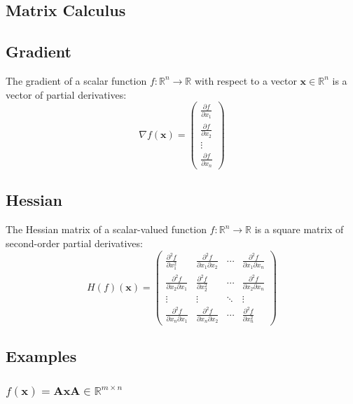 \documentclass[8pt, a4paper, landscape, includeheadfoot]{extarticle}
\begin{document}
\begin{multicols*}{4}
	\section{Matrix Calculus}
	\subsection{Gradient}
	The gradient of a scalar function $f: \mathbb{R}^n \rightarrow \mathbb{R}$ with respect to a vector $\mathbf{x} \in \mathbb{R}^n$ is a vector of partial derivatives:
	$$
		\nabla f(\mathbf{x}) = \begin{pmatrix}
			\frac{\partial f}{\partial x_1} \\
			\frac{\partial f}{\partial x_2} \\
			\vdots                          \\
			\frac{\partial f}{\partial x_n}
		\end{pmatrix}
	$$

	\subsection{Hessian}
	The Hessian matrix of a scalar-valued function $f: \mathbb{R}^n \rightarrow \mathbb{R}$ is a square matrix of second-order partial derivatives:
	$$
		H(f)(\mathbf{x}) = \begin{pmatrix}
			\frac{\partial^2 f}{\partial x_1^2}            & \frac{\partial^2 f}{\partial x_1 \partial x_2} & \cdots & \frac{\partial^2 f}{\partial x_1 \partial x_n} \\
			\frac{\partial^2 f}{\partial x_2 \partial x_1} & \frac{\partial^2 f}{\partial x_2^2}            & \cdots & \frac{\partial^2 f}{\partial x_2 \partial x_n} \\
			\vdots                                         & \vdots                                         & \ddots & \vdots                                         \\
			\frac{\partial^2 f}{\partial x_n \partial x_1} & \frac{\partial^2 f}{\partial x_n \partial x_2} & \cdots & \frac{\partial^2 f}{\partial x_n^2}
		\end{pmatrix}
	$$

	\subsection{Examples}

	\subsubsection{\( f(\mathbf{x}) = \mathbf{A}\mathbf{x} \)\hfill $\mathbf{A}\in\mathbb{R}^{m\times n}$}{}


\end{multicols*}
\end{document}
